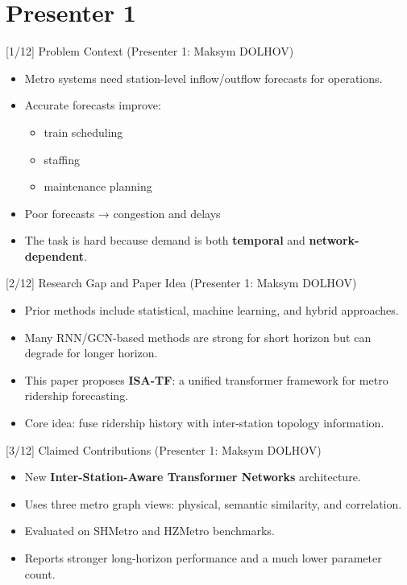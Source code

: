 \documentclass[aspectratio=169]{beamer}
\begin{document}
\section{Presenter 1}

\begin{frame}{[1/12] Problem Context (Presenter 1: Maksym DOLHOV)}\hypertarget{sec:problem}{}

  \begin{itemize}
    \item Metro systems need station-level inflow/outflow forecasts for operations.
    \item Accurate forecasts improve:
\begin{itemize}
\item train scheduling
\item staffing
\item maintenance planning
\end{itemize}
\item Poor forecasts → congestion and delays
    \item The task is hard because demand is both \textbf{temporal} and \textbf{network-dependent}.
  \end{itemize}
\end{frame}

\begin{frame}{[2/12] Research Gap and Paper Idea (Presenter 1: Maksym DOLHOV)}
  \begin{itemize}
    \item Prior methods include statistical, machine learning, and hybrid approaches.
    \item Many RNN/GCN-based methods are strong for short horizon but can degrade for longer horizon.
    \item This paper proposes \textbf{ISA-TF}: a unified transformer framework for metro ridership forecasting.
    \item Core idea: fuse ridership history with inter-station topology information.
  \end{itemize}
\end{frame}

\begin{frame}{[3/12] Claimed Contributions (Presenter 1: Maksym DOLHOV)}
  \begin{itemize}
    \item New \textbf{Inter-Station-Aware Transformer Networks} architecture.
    \item Uses three metro graph views: physical, semantic similarity, and correlation.
    \item Evaluated on SHMetro and HZMetro benchmarks.
    \item Reports stronger long-horizon performance and a much lower parameter count.
  \end{itemize}
\end{frame}
\end{document}
